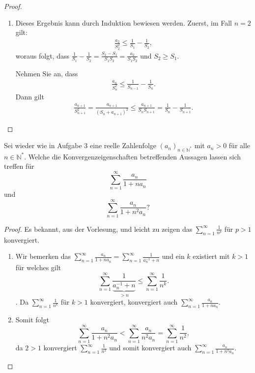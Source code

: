 \documentclass{../problemset}
\begin{document}
\begin{problem}
\begin{proof}
\begin{enumerate}
		\item

		      Dieses Ergebnis kann durch Induktion bewiesen werden. Zuerst, im Fall $n=2$ gilt:
		      \begin{align*}
			      \frac{a_2}{S^2_{2}} \leq \frac{1}{S_{1}}-\frac{1}{S_{2}},
		      \end{align*}
		      woraus folgt, dass $\frac{1}{S_{1}}-\frac{1}{S_{2}}= \frac{S_2-S_1}{S_1S_{2}}=\frac{a_2}{S_1S_{2}}$ und $S_2 \geq S_1$.

		      Nehmen Sie an, dass
		      \begin{align*}
			      \frac{a_n}{S^2_{n}} \leq \frac{1}{S_{n-1}}-\frac{1}{S_{n}}.
		      \end{align*}
		      Dann gilt
		      \begin{align*}
			      \frac{a_{n+1}}{S^2_{n+1}} = \frac{a_{n+1}}{(S_{n}+a_{n+1})^2} \leq  \frac{a_{n+1}}{S_{n}S_{n+1}}=\frac{1}{S_{n}}-\frac{1}{S_{n+1}}.
		      \end{align*}
		      \checkmark
	\end{enumerate}
\end{proof}
\end{problem}

\pagebreak

\begin{problem}[Konvergenzeigenschaften]
Sei wieder wie in Aufgabe 3 eine reelle Zahlenfolge $(a_n)_{n\in\mathbb{N}^*}$ mit $a_n > 0$ für alle $n \in \mathbb{N}^*$. Welche die Konvergenzeigenschaften betreffenden Aussagen lassen sich treffen für
\[
	\sum_{n=1}^{\infty} \frac{a_n}{1 + n a_n}
\]
und
\[
	\sum_{n=1}^{\infty} \frac{a_n}{1 + n^2 a_n}?
\]
\end{problem}
\begin{proof}
	Es bekannt, aus der Vorlesung, und leicht zu zeigen das $\sum_{n=1}^{\infty}\frac{1}{n^p}$ für $p > 1$ konvergiert.
	\begin{enumerate}
		\item Wir bemerken das $\sum_{n=1}^{\infty} \frac{a_n}{1 + n a_n} = \sum_{n=1}^{\infty} \frac{1}{a_n^{-1} + n}$ und ein $k$ existiert mit $k > 1$ für welches gilt \[
                \sum_{n=1}^{\infty} \frac{1}{\underbrace{a_n^{-1} + n}_{> n}} \le \sum_{n=1}^{\infty} \frac{1}{n^k}.
		      \]. Da $\sum_{n=1}^{\infty} \frac{1}{n^k}$ für $k > 1$ konvergiert, konvergiert auch $\sum_{n=1}^{\infty} \frac{a_n}{1 + n a_n}$.
		\item Somit folgt \[
			      \sum_{n=1}^{\infty} \frac{a_n}{1 + n^2 a_n} <	\sum_{n=1}^{\infty} \frac{a_n}{n^2 a_n} = \sum_{n=1}^{\infty} \frac{1}{n^2},
		      \] da $2 > 1$ konvergiert $\sum_{n=1}^{\infty} \frac{1}{n^2}$ und somit konvergiert auch $\sum_{n=1}^{\infty} \frac{a_n}{1 + n^2 a_n}$.
	\end{enumerate}
\end{proof}
\end{document}
